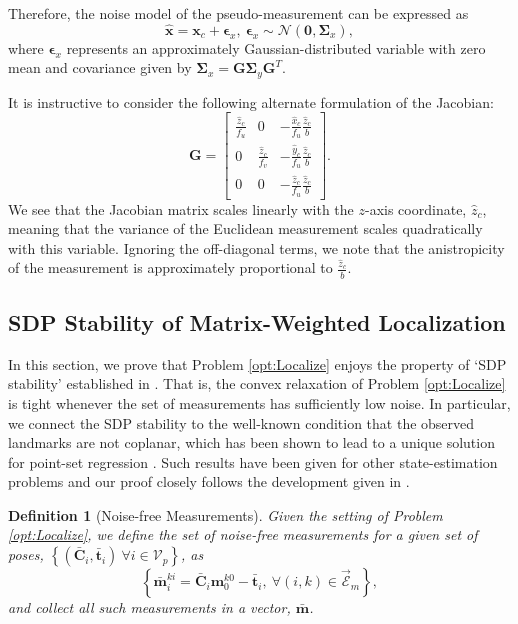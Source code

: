 \documentclass[lettersize,journal]{IEEEtran}
\newcommand{\EdgeSet}{\vec{\bm{\mathcal{E}}}}
\newcommand{\VertSetP}{\bm{\mathcal{V}}_p}
\newtheorem{definition}[theorem]{Definition}
\begin{document}
Therefore, the noise model of the pseudo-measurement can be expressed as
\begin{equation}
	 \hat{\bm{x}} = \bm{x}_c + \bm{\epsilon}_x, ~ \bm{\epsilon}_x \sim \mathcal{N}(\bm{0}, \bm{\Sigma}_x),
\end{equation}
where $ \bm{\epsilon}_x $ represents an approximately Gaussian-distributed variable with zero mean and covariance given by $ \bm{\Sigma}_x = \bm{G}\bm{\Sigma}_y \bm{G}^T $.

It is instructive to consider the following alternate formulation of the Jacobian:
\begin{equation}
	\bm{G} =\begin{bmatrix}
		\frac{\hat{z}_c}{f_u} & 0 & -\frac{\hat{x}_c}{f_u }\frac{\hat{z}_c}{b} \\
		0 & \frac{\hat{z}_c}{f_v } & -\frac{\hat{y}_c}{f_u }\frac{\hat{z}_c}{b} \\
		0 & 0 & -\frac{\hat{z}_c}{f_u}\frac{\hat{z}_c}{b}
	\end{bmatrix}.
\end{equation}
We see that the Jacobian matrix scales linearly with the $z$-axis coordinate, $\hat{z}_c$, meaning that the variance of the Euclidean measurement scales quadratically with this variable. Ignoring the off-diagonal terms, we note that the anistropicity of the measurement is approximately proportional to $\frac{\hat{z}_c}{b}$.

\subsection{SDP Stability of Matrix-Weighted Localization}\label{SM:SDPStability}

In this section, we prove that Problem \eqref{opt:Localize} enjoys the property of `SDP stability' established in \cite{cifuentesLocalStabilitySemidefinite2022}. That is, the convex relaxation of Problem \eqref{opt:Localize} is tight whenever the set of measurements has sufficiently low noise. In particular, we connect the SDP stability to the well-known condition that the observed landmarks are not coplanar, which has been shown to lead to a unique solution for point-set regression \cite{arunLeastSquaresFittingTwo1987}. Such results have been given for other state-estimation problems \cite{rosenSESyncCertifiablyCorrect2019, tianDistributedCertifiablyCorrect2021} and our proof closely follows the development given in \cite{wiseCertifiablyOptimalMonocular2020}.

\begin{definition}[Noise-free Measurements]
	Given the setting of Problem \eqref{opt:Localize}, we define the set of \emph{noise-free measurements} for a given set of poses, $\left\{(\bar{\bm{C}}_{i}, \bar{\bm{t}}_i) ~ \forall i \in \VertSetP \right\}$, as
	\begin{equation}
		\left\{\bar{\bm{m}}_i^{ki} = \bar{\bm{C}}_{i} \bm{m}_0^{k0} - \bar{\bm{t}}_i,~ \forall (i,k)\in \EdgeSet_m\right\},
	\end{equation}
	and collect all such measurements in a vector, $\bar{\bm{m}}$.
\end{definition}
\end{document}
